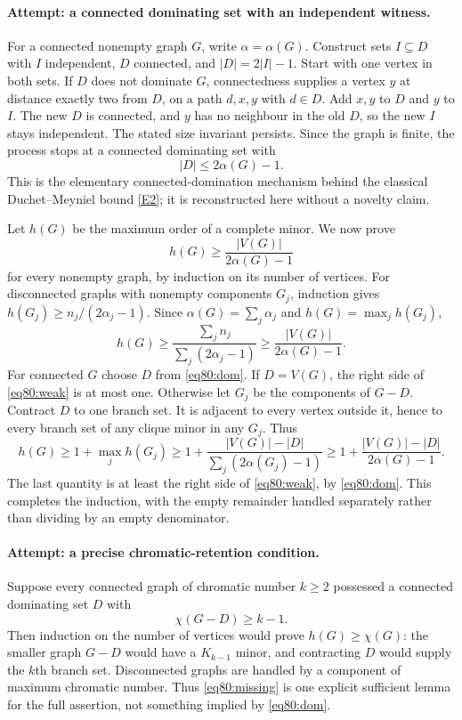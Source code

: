 \documentclass[11pt,a4paper]{article}
\numberwithin{equation}{section}
\newcommand{\eref}[2]{\hyperlink{extra:#1:#2}{[E#2]}}
\begin{document}
\paragraph{Attempt: a connected dominating set with an independent witness.}
For a connected nonempty graph $G$, write $\alpha=\alpha(G)$. Construct
sets $I\subseteq D$ with $I$ independent, $D$ connected, and
$|D|=2|I|-1$. Start with one vertex in both sets. If $D$ does not dominate
$G$, connectedness supplies a vertex $y$ at distance exactly two from
$D$, on a path $d,x,y$ with $d\in D$. Add $x,y$ to $D$ and $y$ to $I$.
The new $D$ is connected, and $y$ has no neighbour in the old $D$, so the
new $I$ stays independent. The stated size invariant persists. Since the
graph is finite, the process stops at a connected dominating set with
\begin{equation}\label{eq80:dom}
 |D|\leq2\alpha(G)-1.
\end{equation}
This is the elementary connected-domination mechanism behind the classical
Duchet--Meyniel bound \eref{80}{2}; it is reconstructed here without a
novelty claim.

Let $h(G)$ be the maximum order of a complete minor. We now prove
\begin{equation}\label{eq80:weak}
 h(G)\geq\frac{|V(G)|}{2\alpha(G)-1}
\end{equation}
for every nonempty graph, by induction on its number of vertices.
For disconnected graphs with nonempty components $G_j$, induction gives
$h(G_j)\geq n_j/(2\alpha_j-1)$. Since
$\alpha(G)=\sum_j\alpha_j$ and $h(G)=\max_jh(G_j)$,
\[
 h(G)\geq\frac{\sum_j n_j}{\sum_j(2\alpha_j-1)}
       \geq\frac{|V(G)|}{2\alpha(G)-1}.
\]
For connected $G$ choose $D$ from \eqref{eq80:dom}. If $D=V(G)$, the
right side of \eqref{eq80:weak} is at most one. Otherwise let $G_j$ be
the components of $G-D$. Contract $D$ to one branch set. It is adjacent
to every vertex outside it, hence to every branch set of any clique minor
in any $G_j$. Thus
\[
 h(G)\geq1+\max_jh(G_j)
 \geq1+\frac{|V(G)|-|D|}{\sum_j(2\alpha(G_j)-1)}
 \geq1+\frac{|V(G)|-|D|}{2\alpha(G)-1}.
\]
The last quantity is at least the right side of \eqref{eq80:weak}, by
\eqref{eq80:dom}. This completes the induction, with the empty remainder
handled separately rather than dividing by an empty denominator.

\paragraph{Attempt: a precise chromatic-retention condition.}
Suppose every connected graph of chromatic number $k\geq2$ possessed a
connected dominating set $D$ with
\begin{equation}\label{eq80:missing}
 \chi(G-D)\geq k-1.
\end{equation}
Then induction on the number of vertices would prove $h(G)\geq\chi(G)$:
the smaller graph $G-D$ would have a $K_{k-1}$ minor, and contracting $D$
would supply the $k$th branch set. Disconnected graphs are handled by a
component of maximum chromatic number. Thus \eqref{eq80:missing} is one
explicit sufficient lemma for the full assertion, not something implied
by \eqref{eq80:dom}.
\end{document}
